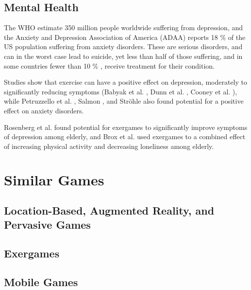 \section{Mental Health}
\label{sec:lit-study-mental-health}

The WHO \cite{WHOdepression} estimate 350 million people worldwide suffering from depression, and the Anxiety and Depression Association of America (ADAA) \cite{ADAAanxiety} reports 18 \% of the US population suffering from anxiety disorders. These are serious disorders, and can in the worst case lead to suicide, yet less than half of those suffering, and in some countries fewer than 10 \% \cite{WHOdepression}, receive treatment for their condition.

Studies show that exercise can have a positive effect on depression, moderately to significantly reducing symptoms (Babyak et al. \cite{babyak2000exercise}, Dunn et al. \cite{dunn2005exercise}, Cooney et al. \cite{cooney2014exercise}), while Petruzzello et al. \cite{petruzzello1991meta}, Salmon \cite{salmon2001effects}, and Ströhle \cite{strohle2009physical} also found potential for a positive effect on anxiety disorders.

Rosenberg et al. \cite{rosenberg2010exergames} found potential for exergames to significantly improve symptoms of depression among elderly, and Brox et al. \cite{brox2011exergames} used exergames to a combined effect of increasing physical activity and decreasing loneliness among elderly.


\chapter{Similar Games}
\label{chapter:lit-study-game-types}

\section{Location-Based, Augmented Reality, and Pervasive Games}
\label{sec:prestudy-ar-location-pervasive-games}

\section{Exergames}


\section{Mobile Games}
\label{sec:mobile-games}

